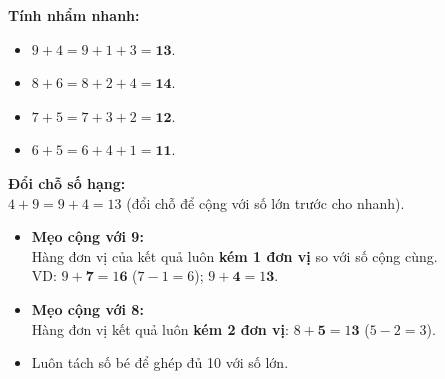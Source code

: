 \documentclass[11pt,a4paper]{article}
\begin{document}
\vspace{-1.5mm}
\noindent
\begin{minipage}[t]{0.49\textwidth}\vspace{0pt}
\begin{tcolorbox}[
  enhanced,
  colback=green!4!white,
  colframe=green!60!black,
  arc=2mm, boxrule=0.8pt,
  left=2mm, right=2mm, top=1.8mm, bottom=1.8mm,
  title={\footnotesize\bfseries\color{white}\faCheckCircle\ 4. Ví dụ thực hành chuẩn mực}
]
{\footnotesize
\textbf{Tính nhẩm nhanh:}\\
\begin{itemize}\setlength{\itemsep}{0.5pt}\setlength{\leftskip}{-2.5mm}
  \item $9 + 4 = 9 + 1 + 3 = \mathbf{13}$.
  \item $8 + 6 = 8 + 2 + 4 = \mathbf{14}$.
  \item $7 + 5 = 7 + 3 + 2 = \mathbf{12}$.
  \item $6 + 5 = 6 + 4 + 1 = \mathbf{11}$.
\end{itemize}
\textbf{Đổi chỗ số hạng:}\\
$4 + 9 = 9 + 4 = 13$ (đổi chỗ để cộng với số lớn trước cho nhanh).
}
\end{tcolorbox}
\end{minipage}
\hfill
\begin{minipage}[t]{0.49\textwidth}\vspace{0pt}
\begin{tcolorbox}[
  enhanced,
  colback=red!4!white,
  colframe=red!75!black,
  arc=2mm, boxrule=0.8pt,
  left=2mm, right=2mm, top=1.8mm, bottom=1.8mm,
  title={\footnotesize\bfseries\color{white}\faExclamationTriangle\ 5. Mẹo tránh bẫy trắc nghiệm}
]
{\footnotesize
\begin{itemize}\setlength{\itemsep}{1pt}\setlength{\leftskip}{-2.5mm}
  \item \textbf{Mẹo cộng với 9:}\\
  Hàng đơn vị của kết quả luôn \textbf{kém 1 đơn vị} so với số cộng cùng.\\
  VD: $9 + \mathbf{7} = 1\mathbf{6}$ ($7 - 1 = 6$); $9 + \mathbf{4} = 1\mathbf{3}$.
  \item \textbf{Mẹo cộng với 8:}\\
  Hàng đơn vị kết quả luôn \textbf{kém 2 đơn vị}: $8 + \mathbf{5} = 1\mathbf{3}$ ($5 - 2 = 3$).
  \item Luôn tách số bé để ghép đủ 10 với số lớn.
\end{itemize}
}
\end{tcolorbox}
\end{minipage}
\end{document}
